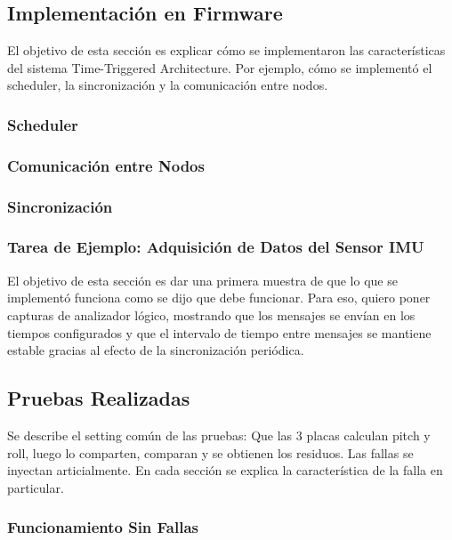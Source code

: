 \subsection{Implementación en Firmware}

El objetivo de esta sección es explicar cómo se implementaron las características del sistema Time-Triggered Architecture. Por ejemplo, cómo se implementó el scheduler, la sincronización y la comunicación entre nodos.

\subsubsection{Scheduler}

\subsubsection{Comunicación entre Nodos}

\subsubsection{Sincronización}

\subsubsection{Tarea de Ejemplo: Adquisición de Datos del Sensor IMU}

El objetivo de esta sección es dar una primera muestra de que lo que se implementó funciona como se dijo que debe funcionar. Para eso, quiero poner capturas de analizador lógico, mostrando que los mensajes se envían en los tiempos configurados y que el intervalo de tiempo entre mensajes se mantiene estable gracias al efecto de la sincronización periódica.

\subsection{Pruebas Realizadas}

Se describe el setting común de las pruebas: Que las 3 placas calculan pitch y roll, luego lo comparten, comparan y se obtienen los residuos. Las fallas se inyectan articialmente. En cada sección se explica la característica de la falla en particular.

\subsubsection{Funcionamiento Sin Fallas}

